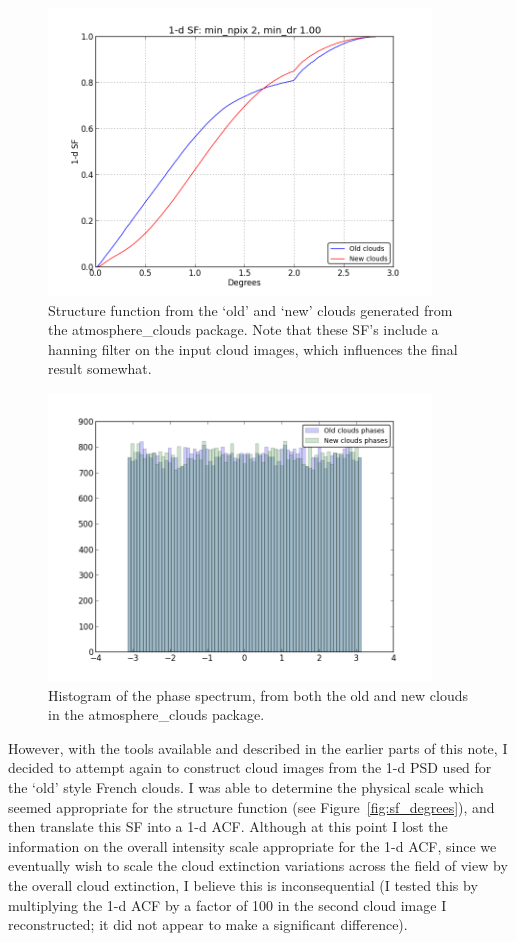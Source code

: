 \documentclass[11pt,preprint]{aastex}
\begin{document}
\begin{figure}[htbp]
\centering
\includegraphics[width=4in]{clouds_sf}
\caption{{\small
Structure function from the `old' and `new' clouds generated from the atmosphere\_clouds package. Note that these SF's include a hanning filter on the input cloud images, which influences the final result somewhat. }}
\label{fig:clouds_sf}
\end{figure}

\begin{figure}[htpb]
\centering
\includegraphics[width=4in]{clouds_phasehist}
\caption{{\small
Histogram of the phase spectrum, from both the old and new clouds in the atmosphere\_clouds package. }}
\label{fig:clouds_phasehist}
\end{figure}

However, with the tools available and described in the earlier parts of this note, I decided to attempt again to construct cloud images from the 1-d PSD used for the `old' style French clouds. I was able to determine the physical scale which seemed appropriate for the structure function (see Figure~\ref{fig:sf_degrees}), and then translate this SF into a 1-d ACF. Although at this point I lost the information on the overall intensity scale appropriate for the 1-d ACF, since we eventually wish to scale the cloud extinction variations across the field of view by the overall cloud extinction, I believe this is inconsequential (I tested this by multiplying the 1-d ACF by a factor of 100 in the second cloud image I reconstructed; it did not appear to make a significant difference). 
\end{document}
